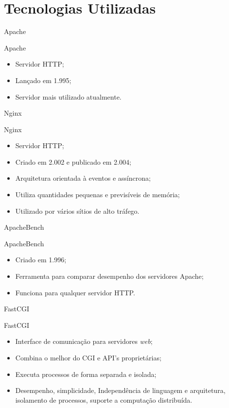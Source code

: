 \section{Tecnologias Utilizadas}\label{sec:tecnologias-utilizadas}

\begin{frame}{Apache}
	\begin{block}{Apache}
	\begin{itemize}
		\item Servidor HTTP;
		\item Lançado em 1.995;
		\item Servidor mais utilizado atualmente.
	\end{itemize}
\end{block}
\end{frame}

\begin{frame}{Nginx}
	\begin{block}{Nginx}
	\begin{itemize}
		\item Servidor HTTP;
		\item Criado em 2.002 e publicado em 2.004;
		\item Arquitetura orientada à eventos e assíncrona;
		\item Utiliza quantidades pequenas e previsíveis de memória;
		\item Utilizado por vários sítios de alto tráfego.
	\end{itemize}
\end{block}
\end{frame}

\begin{frame}{ApacheBench}
	\begin{block}{ApacheBench}
	\begin{itemize}
		\item Criado em 1.996;
		\item Ferramenta para comparar desempenho dos servidores Apache;
		\item Funciona para qualquer servidor HTTP.
	\end{itemize}
\end{block}
\end{frame}

\begin{frame}{FastCGI}
	\begin{block}{FastCGI}
	\begin{itemize}
		\item Interface de comunicação para servidores \textit{web};
		\item Combina o melhor do CGI e API's proprietárias;
		\item Executa processos de forma separada e isolada;
		\item Desempenho, simplicidade, Independência de linguagem e 
		arquitetura, isolamento de processos, suporte a computação distribuída.
	\end{itemize}
\end{block}
\end{frame}

